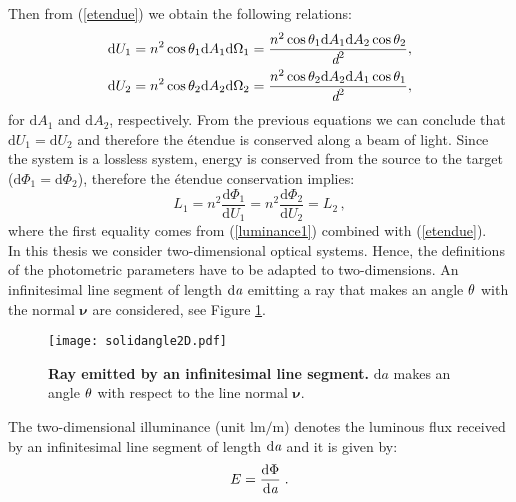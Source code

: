 Then from (\ref{etendue}) we obtain the following relations: 
\begin{subequations}
\begin{align}
\textrm{d}U_1 &= n^2\cos\theta_1 \textrm{d}A_1\textrm{d}\Omega_1= \frac{n^2\cos\theta_1 \textrm{d}A_1\textrm{d}A_2\cos\theta_2}{\textit{d}^2},\\
\textrm{d}U_2 &= n^2 \cos\theta_2\textrm{d}A_2\textrm{d}\Omega_2= \frac{ n^2 \cos\theta_2\textrm{d}A_2\textrm{d}A_1\cos\theta_1}{\textit{d}^2}, \label{eq:dU2}
\end{align}
\end{subequations}
for $\textrm{d}A_1$ and $\textrm{d}A_2$, respectively.
From the previous equations we can conclude that $\textrm{d}U_1=\textrm{d}U_2$ and therefore the \'{e}tendue is conserved along a beam of light. 
Since the system is a lossless system, energy is conserved from the source to the target ($\textrm{d}\Phi_1= \textrm{d}\Phi_2$), therefore the \'{e}tendue conservation implies:
\begin{equation}\label{basicluminance}
L_1 = n^2 \frac{\textrm{d}\Phi_1}{\textrm{d}U_1} = n^2 \frac{\textrm{d}\Phi_2}{\textrm{d}U_2} = L_2\,,
\end{equation}
where the first equality comes from (\ref{luminance1}) combined with (\ref{etendue}).
\\ \indent In this thesis we consider two-dimensional optical systems. 
 Hence, the definitions of the photometric parameters have to be adapted to two-dimensions. An infinitesimal line segment of length $\textrm{d}\textit{a}$ emitting a ray that makes an angle $\theta$ with the normal $\boldsymbol{\nu}$ are considered, see Figure \ref{fig:2Dsolidangle}. 
\begin{figure}[t]
 \label{fig:2Dsolidangle}
     \begin{center}
     \texttt{[image: solidangle2D.pdf]}
     \end{center}
     \caption{\textbf{Ray emitted by an infinitesimal line segment.} $\textrm{d}a$ makes an angle $\theta$ with respect to the line normal $\boldsymbol{\nu}$.}
\label{fig:2Dsolidangle}
 \end{figure}
The two-dimensional illuminance (unit $\textrm{lm}/\textrm{m}$) denotes the luminous flux received by an infinitesimal line segment of length $\textrm{d}\textit{a}$ 
and it is given by:
 \begin{equation}
 E=\frac{\textrm{d}\Phi}{\textrm{d}\textit{a}}\;.
 \end{equation}
